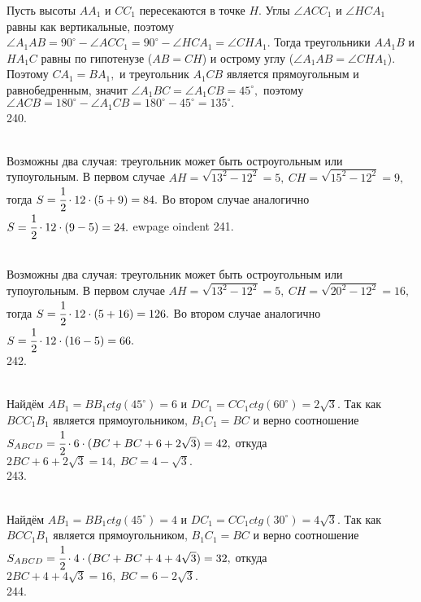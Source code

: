 Пусть высоты $AA_1$ и $CC_1$ пересекаются в точке $H.$ Углы $\angle ACC_1$ и $\angle HCA_1$ равны как вертикальные, поэтому $\angle A_1AB=90^\circ-\angle ACC_1=90^\circ-\angle HCA_1=\angle CHA_1.$ Тогда треугольники $AA_1B$ и $HA_1C$ равны по гипотенузе ($AB=CH$) и острому углу ($\angle A_1AB=\angle CHA_1$). Поэтому $CA_1=BA_1,$ и треугольник $A_1CB$ является прямоугольным и равнобедренным, значит $\angle A_1BC=\angle A_1CB=45^\circ,$ поэтому $\angle ACB=180^\circ-\angle A_1CB=180^\circ-45^\circ=135^\circ.$\\
240. \begin{figure}[ht!]
\end{figure}\\
Возможны два случая: треугольник может быть остроугольным или тупоугольным. В первом случае $AH=\sqrt{13^2-12^2}=5,\ CH=\sqrt{15^2-12^2}=9,$ тогда $S=\cfrac{1}{2}\cdot12\cdot(5+9)=84.$ Во втором случае аналогично $S=\cfrac{1}{2}\cdot12\cdot(9-5)=24.$
ewpage
oindent
241. \begin{figure}[ht!]
\end{figure}\\
Возможны два случая: треугольник может быть остроугольным или тупоугольным. В первом случае $AH=\sqrt{13^2-12^2}=5,\ CH=\sqrt{20^2-12^2}=16,$ тогда $S=\cfrac{1}{2}\cdot12\cdot(5+16)=126.$ Во втором случае аналогично $S=\cfrac{1}{2}\cdot12\cdot(16-5)=66.$\\
242. \begin{figure}[ht!]
\end{figure}\\
Найдём $AB_1=BB_1 ctg(45^\circ)=6$ и $DC_1=CC_1 ctg(60^\circ)=2\sqrt{3}.$ Так как $BCC_1B_1$ является прямоугольником, $B_1C_1=BC$ и верно соотношение
$S_{ABCD}=\cfrac{1}{2}\cdot6\cdot(BC+BC+6+2\sqrt{3})=42,$ откуда $2BC+6+2\sqrt{3}=14,\ BC=4-\sqrt{3}.$\\
243. \begin{figure}[ht!]
\end{figure}\\
Найдём $AB_1=BB_1 ctg(45^\circ)=4$ и $DC_1=CC_1 ctg(30^\circ)=4\sqrt{3}.$ Так как $BCC_1B_1$ является прямоугольником, $B_1C_1=BC$ и верно соотношение
$S_{ABCD}=\cfrac{1}{2}\cdot4\cdot(BC+BC+4+4\sqrt{3})=32,$ откуда $2BC+4+4\sqrt{3}=16,\ BC=6-2\sqrt{3}.$\\
244. \begin{figure}[ht!]
\end{figure}\\
